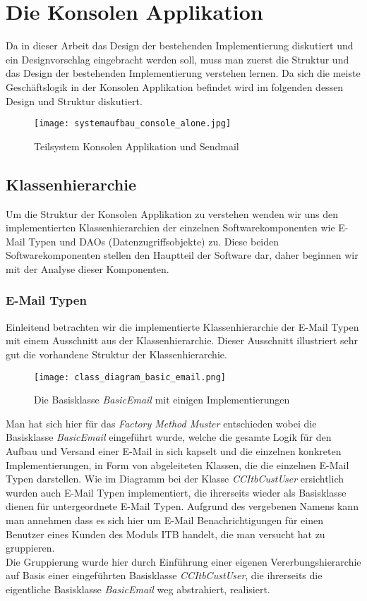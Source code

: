 \chapter{Die Konsolen Applikation}
\label{cha:the-console-app}
Da in dieser Arbeit das Design der bestehenden Implementierung diskutiert und ein Designvorschlag eingebracht werden soll, muss man zuerst die Struktur und das Design der bestehenden Implementierung verstehen lernen. Da sich die meiste Geschäftslogik in der Konsolen Applikation befindet wird im folgenden dessen Design und Struktur diskutiert.\\

\begin{figure}[h]
\centering
\texttt{[image: systemaufbau\_console\_alone.jpg]} 
\caption{Teilsystem Konsolen Applikation und Sendmail}
\label{fig:class-hierarchie-email}
\end{figure}


\newpage
\section{Klassenhierarchie}
\label{sec:console-app-class-hierarchie}
Um die Struktur der Konsolen Applikation  zu verstehen wenden wir uns den implementierten Klassenhierarchien der einzelnen Softwarekomponenten wie E-Mail Typen und DAOs (Datenzugriffsobjekte) zu. Diese beiden Softwarekomponenten stellen den Hauptteil der Software dar, daher beginnen wir mit der Analyse dieser Komponenten. 
\subsection{E-Mail Typen}
Einleitend betrachten wir die implementierte Klassenhierarchie der E-Mail Typen mit einem Ausschnitt aus der Klassenhierarchie. Dieser Ausschnitt illustriert sehr gut die vorhandene Struktur der Klassenhierarchie.
\begin{figure}[h]
\centering
\texttt{[image: class\_diagram\_basic\_email.png]} 
\caption{Die Basisklasse \emph{BasicEmail} mit einigen Implementierungen}
\label{fig:class-hierarchie-email}
\end{figure}

\newpage
Man hat sich hier für das \emph{Factory Method Muster} entschieden wobei die Basisklasse \emph{BasicEmail} eingeführt wurde, welche die gesamte Logik für den Aufbau und Versand einer E-Mail in sich kapselt und die einzelnen konkreten Implementierungen, in Form von abgeleiteten Klassen, die die einzelnen E-Mail Typen darstellen. Wie im Diagramm bei der Klasse \emph{CCItbCustUser} ersichtlich wurden auch E-Mail Typen implementiert, die ihrerseits wieder als Basisklasse dienen für untergeordnete E-Mail Typen. Aufgrund des vergebenen Namens kann man annehmen dass es sich hier um E-Mail Benachrichtigungen für einen Benutzer eines Kunden des Moduls ITB handelt, die man versucht hat zu gruppieren.\\
Die Gruppierung wurde hier durch Einführung einer eigenen Vererbungshierarchie auf Basis einer eingeführten Basisklasse \emph{CCItbCustUser}, die ihrerseits die eigentliche Basisklasse \emph{BasicEmail} weg abstrahiert, realisiert.\\

